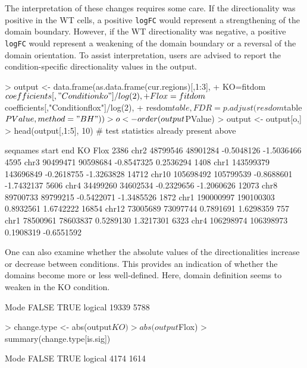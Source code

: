\documentclass[12pt]{report}
\renewenvironment{Schunk}{\vspace{0pt}}{\vspace{0pt}}
\newcommand{\code}[1]{{\small\texttt{#1}}}
\begin{document}
The interpretation of these changes requires some care.
If the directionality was positive in the WT cells, a positive \code{logFC} would represent a strengthening of the domain boundary.
However, if the WT directionality was negative, a positive \code{logFC} would represent a weakening of the domain boundary or a reversal of the domain orientation.
To assist interpretation, users are advised to report the condition-specific directionality values in the output.

\begin{Schunk}
\begin{Sinput}
> output <- data.frame(as.data.frame(cur.regions)[,1:3],
+     KO=fitdom$coefficients[,"Conditionko"]/log(2),
+     Flox=fitdom$coefficients[,"Conditionflox"]/log(2),
+     resdom$table, FDR=p.adjust(resdom$table$PValue, method="BH"))
> o <- order(output$PValue)
> output <- output[o,]
> head(output[,1:5], 10) # test statistics already present above
\end{Sinput}
\begin{Soutput}
      seqnames     start       end         KO       Flox
2386      chr2  48799546  48901284 -0.5048126 -1.5036466
4595      chr3  90499471  90598684 -0.8547325  0.2536294
1408      chr1 143599379 143696849 -0.2618755 -1.3263828
14712    chr10 105698492 105799539 -0.8688601 -1.7432137
5606      chr4  34499260  34602534 -0.2329656 -1.2060626
12073     chr8  89700733  89799215 -0.5422071 -1.3485526
1872      chr1 190000997 190100303  0.8932561  1.6742222
16854    chr12  73005689  73097744  0.7891691  1.6298359
757       chr1  78500961  78603837  0.5289130  1.3217301
6323      chr4 106298974 106398973  0.1908319 -0.6551592
\end{Soutput}
\end{Schunk}

One can also examine whether the absolute values of the directionalities increase or decrease between conditions.
This provides an indication of whether the domains become more or less well-defined.
Here, domain definition seems to weaken in the KO condition.

\begin{Schunk}
\begin{Soutput}
   Mode   FALSE    TRUE 
logical   19339    5788 
\end{Soutput}
\begin{Sinput}
> change.type <- abs(output$KO) > abs(output$Flox)
> summary(change.type[is.sig])
\end{Sinput}
\begin{Soutput}
   Mode   FALSE    TRUE 
logical    4174    1614 
\end{Soutput}
\end{Schunk}
\end{document}
